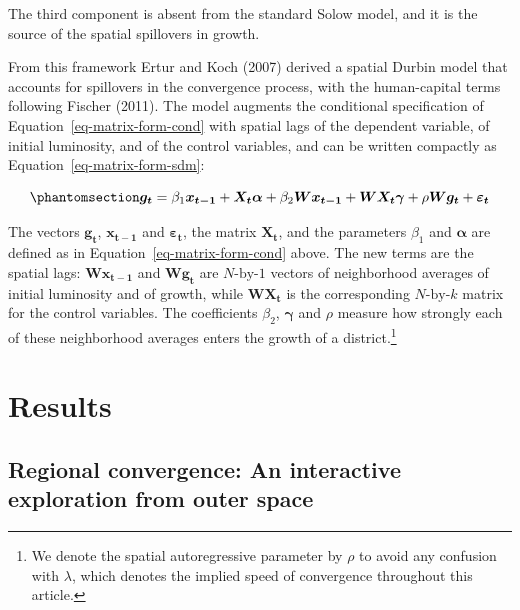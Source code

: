 \documentclass[
  letterpaper,
  DIV=11,
  numbers=noendperiod]{scrartcl}
\begin{document}
The third component is absent from the standard Solow model, and it is
the source of the spatial spillovers in growth.

From this framework Ertur and Koch (2007) derived a spatial Durbin model
that accounts for spillovers in the convergence process, with the
human-capital terms following Fischer (2011). The model augments the
conditional specification of Equation~\ref{eq-matrix-form-cond} with
spatial lags of the dependent variable, of initial luminosity, and of
the control variables, and can be written compactly as
Equation~\ref{eq-matrix-form-sdm}:

\begin{equation}\phantomsection\label{eq-matrix-form-sdm}{
\boldsymbol{g_t} =  \beta_1 \boldsymbol{x_{t-1}} + \boldsymbol{X_t} \boldsymbol{\alpha} + \beta_2 \boldsymbol{W} \boldsymbol{x_{t-1}} + \boldsymbol{W} \boldsymbol{X_t} \boldsymbol{\gamma} + \rho \boldsymbol{W} \boldsymbol{g_t}  + \boldsymbol{\varepsilon_t}
}\end{equation}

The vectors \(\boldsymbol{g_t}\), \(\boldsymbol{x_{t-1}}\) and
\(\boldsymbol{\varepsilon_t}\), the matrix \(\boldsymbol{X_t}\), and the
parameters \(\beta_1\) and \(\boldsymbol{\alpha}\) are defined as in
Equation~\ref{eq-matrix-form-cond} above. The new terms are the spatial
lags: \(\boldsymbol{W} \boldsymbol{x_{t-1}}\) and
\(\boldsymbol{W} \boldsymbol{g_t}\) are \(N\text{-by-}1\) vectors of
neighborhood averages of initial luminosity and of growth, while
\(\boldsymbol{W} \boldsymbol{X_t}\) is the corresponding
\(N\text{-by-}k\) matrix for the control variables. The coefficients
\(\beta_2\), \(\boldsymbol{\gamma}\) and \(\rho\) measure how strongly
each of these neighborhood averages enters the growth of a
district.\footnote{We denote the spatial autoregressive parameter by
  \(\rho\) to avoid any confusion with \(\lambda\), which denotes the
  implied speed of convergence throughout this article.}

\section{Results}\label{results}

\subsection{Regional convergence: An interactive exploration from outer
space}\label{regional-convergence-an-interactive-exploration-from-outer-space}
\end{document}

